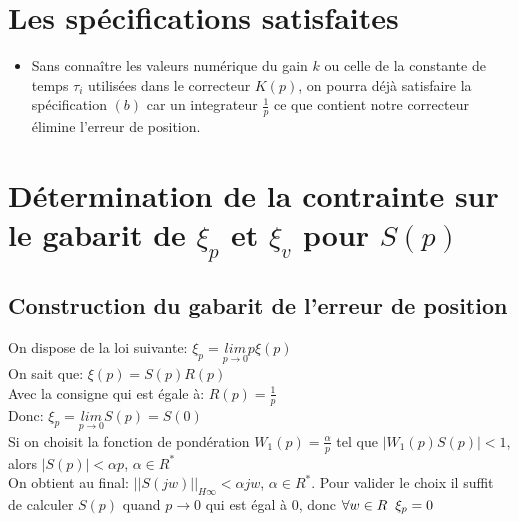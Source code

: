 \documentclass[12pt, a4paper, openany]{report}
\begin{document}
 \section{Les spécifications satisfaites}
 
  \begin{itemize} [label=,font=\small \color{black}]
  	\item Sans connaître les valeurs numérique du gain $k$ ou celle de la constante de temps $\tau_{i}$ utilisées dans le correcteur $K(p)$, on pourra déjà satisfaire la spécification $(b)$ car un integrateur $\frac{1}{p}$ ce que contient notre correcteur élimine l'erreur de position.
  \end{itemize}
 
 \section{Détermination de la contrainte sur le gabarit de $\xi_{p}$ \hspace{1mm} et \hspace{1mm} $\xi_{v} $ pour $S(p)$}  
 
  \subsection{Construction du gabarit de l'erreur de position}
  
   On dispose de la loi suivante: \hspace{5mm} $\xi_{p}=\underset{p\longrightarrow 0}{lim}  p\xi(p)$\\[0.75cm]
   On sait que: \hspace{5mm} $\xi(p)=S(p)R(p)$\\[0.75cm]
   Avec la consigne qui est égale à: \hspace{5mm} $R(p)=\frac{1}{p}$\\[0.75cm]
   Donc: \hspace{5mm} $\xi_{p}=\underset{p\longrightarrow 0}{lim} S(p)=S(0)$\\[0.75cm]
   Si on choisit la fonction de pondération $W_{1}(p)=\frac{\alpha}{p}$ tel que $|W_{1}(p)S(p)|<1$, alors $|S(p)|<\alpha p$, $\alpha \in R^{*}$ \\[0.75cm]
   On obtient au final: \hspace{5mm} $||S(jw)||_{H\infty}<\alpha jw$, $\alpha \in R^{*}$. Pour valider le choix il suffit de calculer $S(p)$ quand $p\rightarrow0$ qui est égal à $0$, donc $\forall w \in R \hspace{2mm} \xi_{p}=0$ 
   
\end{document}
